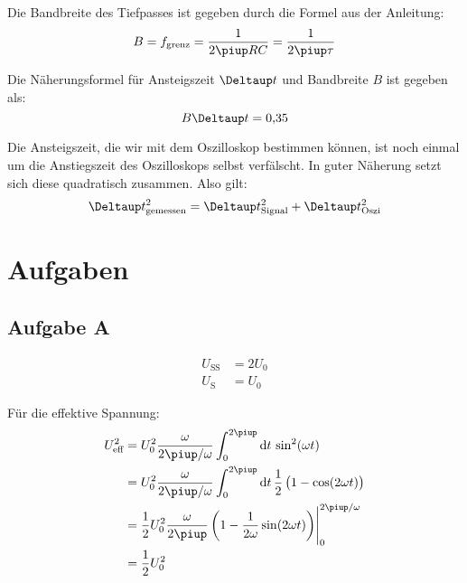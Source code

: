 Die Bandbreite des Tiefpasses ist gegeben durch die Formel aus der Anleitung:
\begin{equation}
	\label{eq:0.3}
	B = f_\text{grenz} = \frac{1}{2\piup RC}
	= \frac{1}{2\piup \tau}
\end{equation}

Die Näherungsformel für Ansteigszeit $\Deltaup t$ und Bandbreite $B$ ist
gegeben als:
\begin{equation}
	\label{eq:0.4}
	B \Deltaup t = \num{0.35}
\end{equation}

Die Ansteigszeit, die wir mit dem Oszilloskop bestimmen können, ist noch einmal
um die Anstiegszeit des Oszilloskops selbst verfälscht. In guter Näherung setzt
sich diese quadratisch zusammen. Also gilt:
\begin{equation}
	\label{eq:0.5}
	\Deltaup t_\text{gemessen}^2 = \Deltaup t_\text{Signal}^2 + \Deltaup t_\text{Oszi}^2
\end{equation}


\section{Aufgaben}

\subsection{Aufgabe A}

\begin{align*}
	U_\text{SS}&=2U_0\\
	U_\text{S}&=U_0
\end{align*}

Für die effektive Spannung:
\begin{align*}
	U_\text{eff}^2
	&= U_0^2 \frac{\omega}{2\piup/\omega} \int_0^{2\piup} \dif t \, \sin^2(\omega t) \\
	&= U_0^2 \frac{\omega}{2\piup/\omega} \int_0^{2\piup} \dif t \, \half \del{1- \cos(2\omega t)} \\
	&= \half U_0^2 \frac{\omega}{2\piup} \eval{\del{1- \frac{1}{2\omega} \sin(2\omega t)}}_0^{2\piup/\omega}  \\
	&= \half U_0^2
\end{align*}

